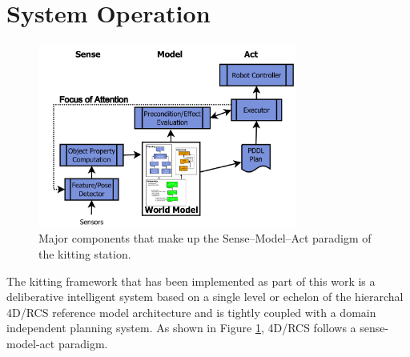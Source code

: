 %
\section{System Operation}
\label{sect:operation}
%
\begin{figure}[htb!]
\begin{center}
\includegraphics[width=8.5cm]{images/SenseModelAct.jpg}
\caption{Major components that make up the Sense--Model--Act paradigm of the kitting station.}
\label{fig:SenseModelAct}
\end{center}
\end{figure}
The kitting framework that has been implemented as part of this work 
is a deliberative intelligent system based on a single 
level or echelon of the hierarchal 4D/RCS 
reference model architecture \cite{Albus2000} and is
tightly coupled with a domain independent planning system. As shown
in Figure \ref{fig:SenseModelAct}, 4D/RCS 
follows a sense-model-act paradigm. 
%
